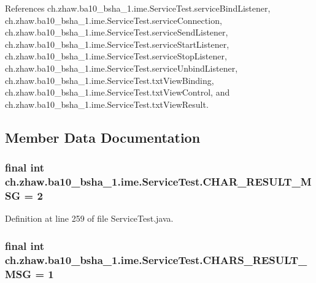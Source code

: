 References ch.zhaw.ba10\_\-bsha\_\-1.ime.ServiceTest.serviceBindListener, ch.zhaw.ba10\_\-bsha\_\-1.ime.ServiceTest.serviceConnection, ch.zhaw.ba10\_\-bsha\_\-1.ime.ServiceTest.serviceSendListener, ch.zhaw.ba10\_\-bsha\_\-1.ime.ServiceTest.serviceStartListener, ch.zhaw.ba10\_\-bsha\_\-1.ime.ServiceTest.serviceStopListener, ch.zhaw.ba10\_\-bsha\_\-1.ime.ServiceTest.serviceUnbindListener, ch.zhaw.ba10\_\-bsha\_\-1.ime.ServiceTest.txtViewBinding, ch.zhaw.ba10\_\-bsha\_\-1.ime.ServiceTest.txtViewControl, and ch.zhaw.ba10\_\-bsha\_\-1.ime.ServiceTest.txtViewResult.

\subsection{Member Data Documentation}
\hypertarget{classch_1_1zhaw_1_1ba10__bsha__1_1_1ime_1_1ServiceTest_af5742511ec4008834a2d1354102ce616}{
\subsubsection[{CHAR\_\-RESULT\_\-MSG}]{\setlength{\rightskip}{0pt plus 5cm}final int {\bf ch.zhaw.ba10\_\-bsha\_\-1.ime.ServiceTest.CHAR\_\-RESULT\_\-MSG} = 2}}
\label{classch_1_1zhaw_1_1ba10__bsha__1_1_1ime_1_1ServiceTest_af5742511ec4008834a2d1354102ce616}


Definition at line 259 of file ServiceTest.java.\hypertarget{classch_1_1zhaw_1_1ba10__bsha__1_1_1ime_1_1ServiceTest_ac1d59d2fe1c01777f19b3c9bdf279f4f}{
\subsubsection[{CHARS\_\-RESULT\_\-MSG}]{\setlength{\rightskip}{0pt plus 5cm}final int {\bf ch.zhaw.ba10\_\-bsha\_\-1.ime.ServiceTest.CHARS\_\-RESULT\_\-MSG} = 1}}
\label{classch_1_1zhaw_1_1ba10__bsha__1_1_1ime_1_1ServiceTest_ac1d59d2fe1c01777f19b3c9bdf279f4f}


